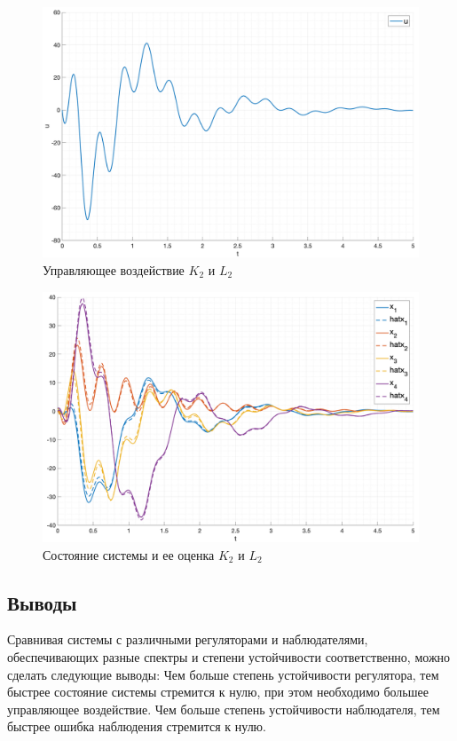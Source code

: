 \begin{figure}[ht!]
    \centering
    \includegraphics[width=\textwidth]{media/plots/task2_4_u.png}
    \caption{Управляющее воздействие $K_2$ и $L_2$}
    \label{fig:task2_2_2_u}
\end{figure}
\begin{figure}[ht!]
    \centering
    \includegraphics[width=\textwidth]{media/plots/task2_4_xh.png}
    \caption{Состояние системы и ее оценка $K_2$ и $L_2$}
    \label{fig:task2_2_2_xh}
\end{figure}
\FloatBarrier

\subsection{Выводы}
Сравнивая системы с различными регуляторами и наблюдателями, обеспечивающих разные спектры и 
степени устойчивости соответственно, можно сделать следующие выводы:
Чем больше степень устойчивости регулятора, тем быстрее состояние системы
стремится к нулю, при этом необходимо большее управляющее воздействие.
Чем больше степень устойчивости наблюдателя, тем быстрее ошибка наблюдения
стремится к нулю. 

